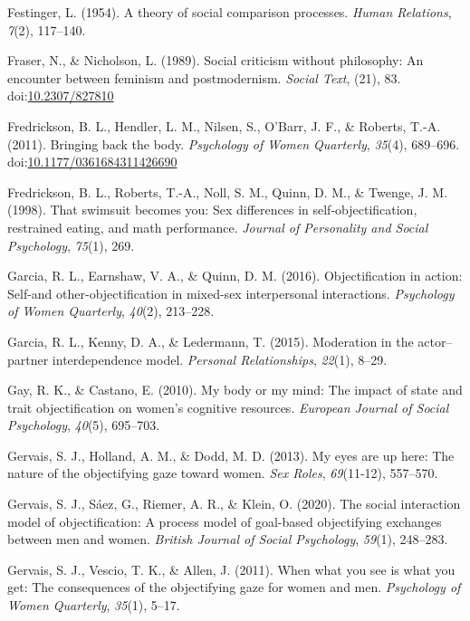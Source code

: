 \documentclass[man]{apa6}
\begin{document}
\hypertarget{ref-festinger1954theory}{}
Festinger, L. (1954). A theory of social comparison processes.
\emph{Human Relations}, \emph{7}(2), 117--140.

\hypertarget{ref-frasernicholson1989}{}
Fraser, N., \& Nicholson, L. (1989). Social criticism without
philosophy: An encounter between feminism and postmodernism.
\emph{Social Text}, (21), 83.
doi:\href{https://doi.org/10.2307/827810}{10.2307/827810}

\hypertarget{ref-fredricksonetal2011}{}
Fredrickson, B. L., Hendler, L. M., Nilsen, S., O'Barr, J. F., \&
Roberts, T.-A. (2011). Bringing back the body. \emph{Psychology of Women
Quarterly}, \emph{35}(4), 689--696.
doi:\href{https://doi.org/10.1177/0361684311426690}{10.1177/0361684311426690}

\hypertarget{ref-fredrickson1998swimsuit}{}
Fredrickson, B. L., Roberts, T.-A., Noll, S. M., Quinn, D. M., \&
Twenge, J. M. (1998). That swimsuit becomes you: Sex differences in
self-objectification, restrained eating, and math performance.
\emph{Journal of Personality and Social Psychology}, \emph{75}(1), 269.

\hypertarget{ref-garcia2016objectification}{}
Garcia, R. L., Earnshaw, V. A., \& Quinn, D. M. (2016). Objectification
in action: Self-and other-objectification in mixed-sex interpersonal
interactions. \emph{Psychology of Women Quarterly}, \emph{40}(2),
213--228.

\hypertarget{ref-garcia2015moderation}{}
Garcia, R. L., Kenny, D. A., \& Ledermann, T. (2015). Moderation in the
actor--partner interdependence model. \emph{Personal Relationships},
\emph{22}(1), 8--29.

\hypertarget{ref-gay2010my}{}
Gay, R. K., \& Castano, E. (2010). My body or my mind: The impact of
state and trait objectification on women's cognitive resources.
\emph{European Journal of Social Psychology}, \emph{40}(5), 695--703.

\hypertarget{ref-gervais2013my}{}
Gervais, S. J., Holland, A. M., \& Dodd, M. D. (2013). My eyes are up
here: The nature of the objectifying gaze toward women. \emph{Sex
Roles}, \emph{69}(11-12), 557--570.

\hypertarget{ref-gervais2020social}{}
Gervais, S. J., Sáez, G., Riemer, A. R., \& Klein, O. (2020). The social
interaction model of objectification: A process model of goal-based
objectifying exchanges between men and women. \emph{British Journal of
Social Psychology}, \emph{59}(1), 248--283.

\hypertarget{ref-gervais2011you}{}
Gervais, S. J., Vescio, T. K., \& Allen, J. (2011). When what you see is
what you get: The consequences of the objectifying gaze for women and
men. \emph{Psychology of Women Quarterly}, \emph{35}(1), 5--17.
\end{document}
